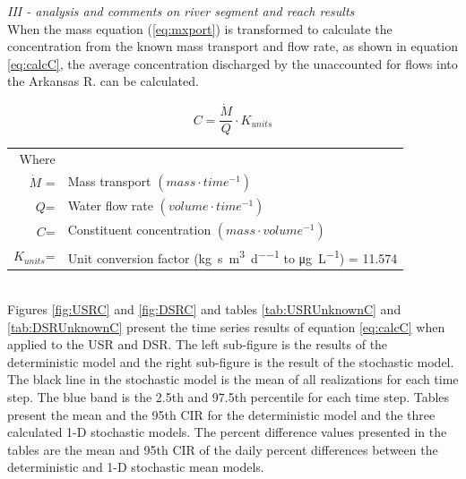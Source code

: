 \begin{linenumbers}
\emph{III - analysis and comments on river segment and reach results}\\

When the mass equation (\ref{eq:mxport}) is transformed to calculate the concentration from the known mass transport and flow rate, as shown in equation \ref{eq:calcC}, the average concentration discharged by the unaccounted for flows into the Arkansas R. can be calculated.

\begin{equation}
	C=\frac{\dot{M}}{Q} \cdot K_{units}
	\label{eq:calcC}
\end{equation}
\begin{tabular}{rl}
Where&\\
	$\dot{M}$ =&Mass transport $(mass \cdot time^{-1})$\\
	$Q$=&Water flow rate $(volume \cdot time^{-1})$\\
	$C$=&Constituent concentration $(mass \cdot volume^{-1})$\\
	$K_{units}$=&Unit conversion factor (\si{\kilo\gram\second\per\cubic\meter\per\day} to \si{\micro\gram\per\liter}) = 11.574
\end{tabular}\\

Figures \ref{fig:USRC} and \ref{fig:DSRC} and tables \ref{tab:USRUnknownC} and \ref{tab:DSRUnknownC} present the time series results of equation \ref{eq:calcC} when applied to the USR and DSR.  The left sub-figure is the results of the deterministic model and the right sub-figure is the result of the stochastic model.  The black line in the stochastic model is the mean of all realizations for each time step.  The blue band is the 2.5th and 97.5th percentile for each time step.  Tables present the mean and the 95th CIR for the deterministic model and the three calculated 1-D stochastic models.  The percent difference values presented in the tables are the mean and 95th CIR of the daily percent differences between the deterministic and 1-D stochastic mean models.


\end{linenumbers}
